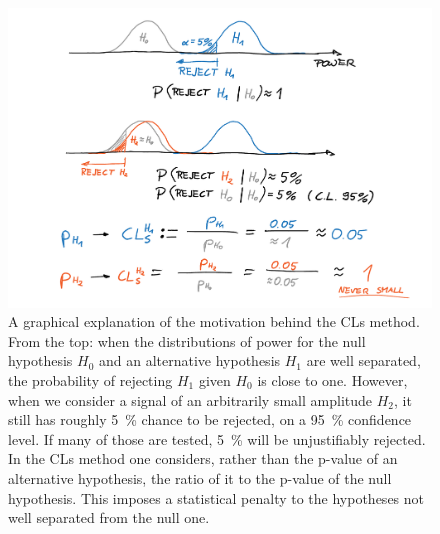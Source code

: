
\begin{figure}
  \centering \includegraphics[width=0.8\linewidth]{gfx/axions/CLs.pdf}
  \caption{A graphical explanation of the motivation behind the CLs method.
  From the top: when the distributions of power for the null hypothesis $H_0$ and an alternative hypothesis $H_1$ are well separated, the probability of rejecting $H_1$ given $H_0$ is close to one.
  However, when we consider a signal of an arbitrarily small amplitude $H_2$, it still has roughly \SI{5}{\percent} chance to be rejected, on a \SI{95}{\percent} confidence level.
  If many of those are tested, \SI{5}{\percent} will be unjustifiably rejected.
  In the CLs method one considers, rather than the p-value of an alternative hypothesis, the ratio of it to the p-value of the null hypothesis.
  This imposes a statistical penalty to the hypotheses not well separated from the null one.}\label{fig:CLs}
\end{figure}

